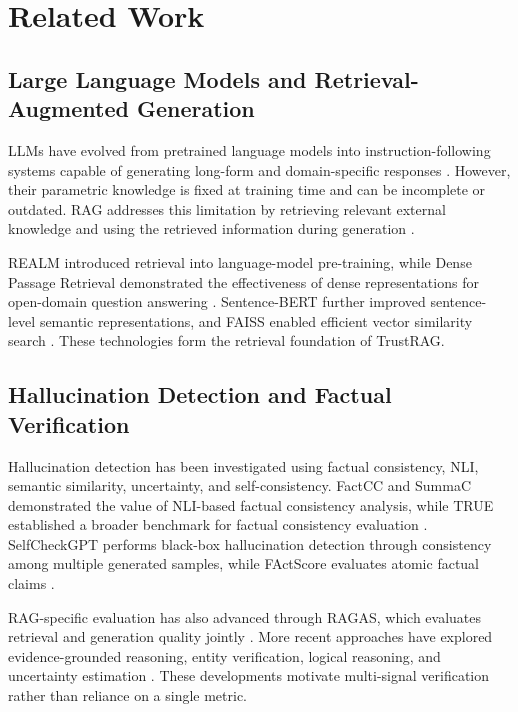 \documentclass[conference]{IEEEtran}
\begin{document}
\section{Related Work}

\subsection{Large Language Models and Retrieval-Augmented Generation}

LLMs have evolved from pretrained language models into instruction-following systems capable of generating long-form and domain-specific responses \cite{brown2020,devlin2019,vaswani2017}. However, their parametric knowledge is fixed at training time and can be incomplete or outdated. RAG addresses this limitation by retrieving relevant external knowledge and using the retrieved information during generation \cite{lewis2020}.

REALM introduced retrieval into language-model pre-training, while Dense Passage Retrieval demonstrated the effectiveness of dense representations for open-domain question answering \cite{guu2020,karpukhin2020}. Sentence-BERT further improved sentence-level semantic representations, and FAISS enabled efficient vector similarity search \cite{reimers2019,johnson2021}. These technologies form the retrieval foundation of TrustRAG.

\subsection{Hallucination Detection and Factual Verification}

Hallucination detection has been investigated using factual consistency, NLI, semantic similarity, uncertainty, and self-consistency. FactCC and SummaC demonstrated the value of NLI-based factual consistency analysis, while TRUE established a broader benchmark for factual consistency evaluation \cite{factcc2020,summac2022,true2022}. SelfCheckGPT performs black-box hallucination detection through consistency among multiple generated samples, while FActScore evaluates atomic factual claims \cite{manakul2023,min2023}.

RAG-specific evaluation has also advanced through RAGAS, which evaluates retrieval and generation quality jointly \cite{es2024}. More recent approaches have explored evidence-grounded reasoning, entity verification, logical reasoning, and uncertainty estimation \cite{rlseek2026,evidenceentity2026,logic2026,march2026,uncertainty2026}. These developments motivate multi-signal verification rather than reliance on a single metric.
\end{document}
